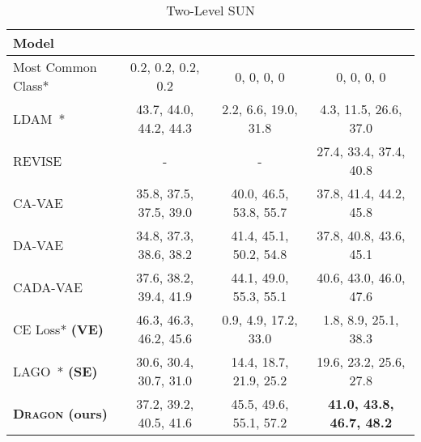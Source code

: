 \documentclass[10pt,twocolumn,letterpaper]{article}
\newcommand{\DRAGON}{\textsc{Dragon}}
\begin{document}
\begin{table*}
\bigskip
\begin{subtable}{\textwidth}
\centering
   \begin{tabular}{l|c|c|c}
   Model & 
    \textbf{} & \textbf{} &
    \textbf{} \\
  \midrule
    Most Common Class* &
    0.2, 0.2, 0.2, 0.2 & 0, 0, 0, 0 & 0, 0, 0, 0  \\
    \hline
    LDAM~\cite{cao2019learning}* &
    43.7, 44.0, 44.2, 44.3 & 2.2, 6.6, 19.0, 31.8 & 4.3, 11.5, 26.6, 37.0
    \\
    \hline
    REVISE~\cite{REVISE} &
    - & - & 27.4, 33.4, 37.4, 40.8  \\
    CA-VAE~\cite{Schnfeld2019GeneralizedZL} &
    35.8, 37.5, 37.5, 39.0 & 40.0, 46.5, 53.8, 55.7 & 37.8, 41.4, 44.2, 45.8 \\
    DA-VAE~\cite{Schnfeld2019GeneralizedZL} &
    34.8, 37.3, 38.6, 38.2 & 41.4, 45.1, 50.2, 54.8 & 37.8, 40.8, 43.6, 45.1 \\
    CADA-VAE~\cite{Schnfeld2019GeneralizedZL} &
    37.6, 38.2, 39.4, 41.9 & 44.1, 49.0, 55.3, 55.1 & 40.6, 43.0, 46.0, 47.6  \\
    \hline
    CE Loss* \textbf{(VE)} &
    46.3, 46.3, 46.2, 45.6 & 0.9, 4.9, 17.2, 33.0 & 1.8, 8.9, 25.1, 38.3   \\
    LAGO~\cite{LAGO}* \textbf{(SE)} &
    30.6, 30.4, 30.7, 31.0 & 14.4, 18.7, 21.9, 25.2 & 19.6, 23.2, 25.6, 27.8   \\
    \textbf{\DRAGON{} (ours)} &
    37.2, 39.2, 40.5, 41.6 & 45.5, 49.6, 55.1, 57.2 & \textbf{41.0, 43.8, 46.7, 48.2}   \\
\bottomrule
\end{tabular}



\caption{Two-Level SUN}
   \label{tab:sub_second}
\end{subtable}


\end{table*}
\end{document}
